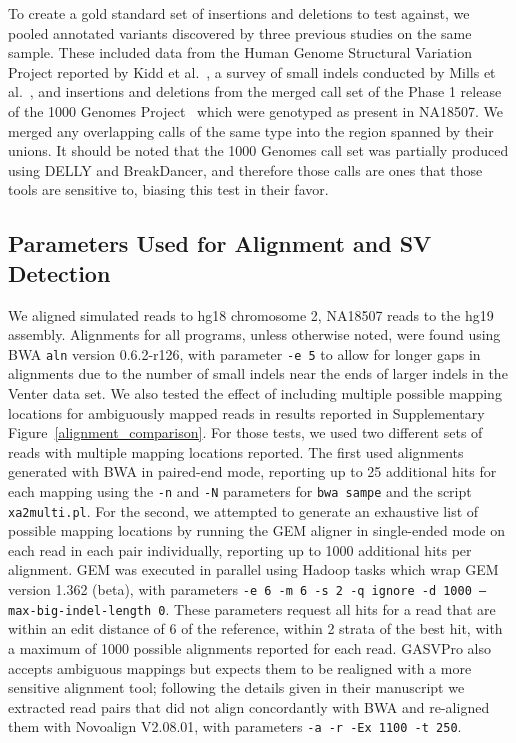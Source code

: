 \documentclass[11pt]{article}
\begin{document}
To create a gold standard set of insertions and deletions to test against, we pooled annotated variants discovered by three previous studies on the same sample. These included data from the Human Genome Structural Variation Project reported by Kidd et al.~\citep{Kidd:2008p926}, a survey of small indels conducted by Mills et al.~\citep{Mills:2011fi}, and insertions and deletions from the merged call set of the Phase 1 release of the 1000 Genomes Project~\citep{GenomesProjectConsortium:2012co} which were genotyped as present in NA18507. We merged any overlapping calls of the same type into the region spanned by their unions. It should be noted that the 1000 Genomes call set was partially produced using DELLY and BreakDancer, and therefore those calls are ones that those tools are sensitive to, biasing this test in their favor.

\subsection{Parameters Used for Alignment and SV Detection}

We aligned simulated reads to hg18 chromosome 2, NA18507 reads to the hg19 assembly. Alignments for all programs, unless otherwise noted, were found using BWA \texttt{aln} version 0.6.2-r126, with parameter \texttt{-e 5} to allow for longer gaps in alignments due to the number of small indels near the ends of larger indels in the Venter data set. We also tested the effect of including multiple possible mapping locations for ambiguously mapped reads in results reported in Supplementary Figure~\ref{alignment_comparison}. For those tests, we used two different sets of reads with multiple mapping locations reported. The first used alignments generated with BWA in paired-end mode, reporting up to 25 additional hits for each mapping  using the \texttt{-n} and \texttt{-N} parameters for \texttt{bwa sampe} and the script \texttt{xa2multi.pl}. For the second, we attempted to generate an exhaustive list of possible mapping locations by running the GEM aligner in single-ended mode on each read in each pair individually, reporting up to 1000 additional hits per alignment. GEM was executed in parallel using Hadoop tasks which wrap GEM version 1.362 (beta), with parameters \texttt{-e 6 -m 6 -s 2 -q ignore -d 1000 --max-big-indel-length 0}. These parameters request all hits for a read that are within an edit distance of 6 of the reference, within 2 strata of the best hit, with a maximum of 1000 possible alignments reported for each read. GASVPro also accepts ambiguous mappings but expects them to be realigned with a more sensitive alignment tool; following the details given in their manuscript we extracted read pairs that did not align concordantly with BWA and re-aligned them with Novoalign V2.08.01, with parameters \texttt{-a -r -Ex 1100 -t 250}. 
\end{document}
